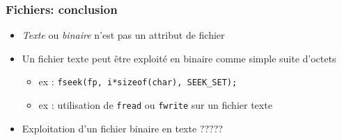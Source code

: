 \documentclass[table,handout,tikz,12pt,svgnames]{beamer}
\begin{document}
\begin{frame}[fragile=singleslide]
	\frametitle{Fichiers: conclusion}
	\begin{block}{}
		\begin{itemize}
			\item \textit{Texte} ou \textit{binaire} n'est pas un attribut de fichier
			\item Un fichier texte peut être exploité en binaire comme simple suite d'octets
			\begin{itemize}
				\item ex : \texttt{fseek(fp, i*sizeof(char), SEEK\_SET);}
				\item ex : utilisation de \texttt{fread} ou \texttt{fwrite} sur un fichier texte
			\end{itemize}
			\item Exploitation d'un fichier binaire en texte ?????
		\end{itemize}
	\end{block}
\end{frame}









\end{document}
